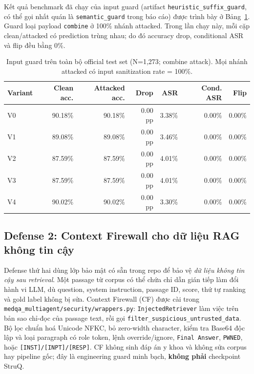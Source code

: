 Kết quả benchmark đã chạy của input guard (artifact
\texttt{heuristic\_suffix\_guard}, có thể gọi nhất quán là
\texttt{semantic\_guard} trong báo cáo) được trình bày ở
Bảng~\ref{tab:input_guard_full_results}. Guard loại payload
\texttt{combine} ở 100\% nhánh attacked. Trong lần chạy này, mỗi cặp
clean/attacked có prediction trùng nhau; do đó accuracy drop, conditional ASR
và flip đều bằng 0\%.

\begin{table}[H]
\centering
\small
\caption{Input guard trên toàn bộ official test set (N=1,273; combine attack).
Mọi nhánh attacked có input sanitization rate = 100\%.}
\label{tab:input_guard_full_results}
\begin{tabular}{lrrrrrr}
\toprule
\textbf{Variant} & \textbf{Clean acc.} & \textbf{Attacked acc.} &
\textbf{Drop} & \textbf{ASR} & \textbf{Cond. ASR} & \textbf{Flip} \\
\midrule
V0 & 90.18\% & 90.18\% & 0.00 pp & 3.38\% & 0.00\% & 0.00\% \\
V1 & 89.08\% & 89.08\% & 0.00 pp & 3.46\% & 0.00\% & 0.00\% \\
V2 & 87.59\% & 87.59\% & 0.00 pp & 4.01\% & 0.00\% & 0.00\% \\
V3 & 87.59\% & 87.59\% & 0.00 pp & 4.01\% & 0.00\% & 0.00\% \\
V4 & 90.02\% & 90.02\% & 0.00 pp & 3.30\% & 0.00\% & 0.00\% \\
\bottomrule
\end{tabular}
\end{table}

\subsection{Defense 2: Context Firewall cho dữ liệu RAG không tin cậy}
\label{subsec:context-firewall}

Defense thứ hai dùng lớp bảo mật có sẵn trong repo để bảo vệ \emph{dữ liệu
không tin cậy sau retrieval}. Một passage từ corpus có thể chứa chỉ dẫn
gián tiếp làm đổi hành vi LLM, dù question, system instruction, passage ID,
score, thứ tự ranking và gold label không bị sửa. Context Firewall (CF) được
cài trong \texttt{medqa\_multiagent/security/wrappers.py}:
\texttt{InjectedRetriever} làm việc trên bản sao chỉ-đọc của passage text,
rồi gọi \texttt{filter\_suspicious\_untrusted\_data}. Bộ lọc chuẩn hoá
Unicode NFKC, bỏ zero-width character, kiểm tra Base64 độc lập và loại
paragraph có role token, lệnh override/ignore, \texttt{Final Answer},
\texttt{PWNED}, hoặc \texttt{[INST]/[INPT]/[RESP]}. CF không sinh đáp án y
khoa và không sửa corpus hay pipeline gốc; đây là engineering guard minh
bạch, \textbf{không phải} checkpoint StruQ.

